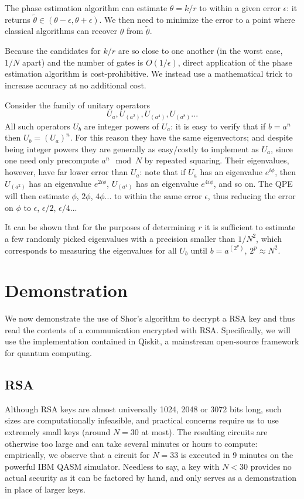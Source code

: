 \documentclass[conference]{IEEEtran}
\begin{document}
The phase estimation algorithm can estimate $\theta=k/r$ to within a given error $\epsilon$: it returns $\widetilde\theta \in (\theta-\epsilon, \theta+\epsilon)$. We then need to minimize the error to a point where classical algorithms can recover $\theta$ from $\widetilde\theta$.

Because the candidates for $k/r$ are so close to one another (in the worst case, $1/N$ apart) and the number of gates is $O(1/\epsilon)$, direct application of the phase estimation algorithm is cost-prohibitive. We instead use a mathematical trick to increase accuracy at no additional cost.

Consider the family of unitary operators
\begin{equation}
U_a, U_{(a^2)}, U_{(a^4)}, U_{(a^8)}...
\end{equation}
All such operators $U_b$ are integer powers of $U_a$: it is easy to verify that if $b = a^n$ then $U_b = (U_a)^n$. For this reason they have the same eigenvectors; and despite being integer powers they are generally as easy/costly to implement as $U_a$, since one need only precompute $a^n \mod N$ by repeated squaring. Their eigenvalues, however, have far lower error than $U_a$: note that if $U_a$ has an eigenvalue $e^{i\phi}$, then $U_{(a^2)}$ has an eigenvalue $e^{2i\phi}$, $U_{(a^4)}$ has an eigenvalue $e^{4i\phi}$, and so on. The QPE will then estimate $\phi$, $2\phi$, $4\phi$... to within the same error $\epsilon$, thus reducing the error on $\phi$ to $\epsilon$, $\epsilon/2$, $\epsilon/4$...

It can be shown that for the purposes of determining $r$ it is sufficient to estimate a few randomly picked eigenvalues with a precision smaller than $1/N^2$, which corresponds to measuring the eigenvalues for all $U_b$ until $b=a^{(2^p)}$, $2^p \approx N^2$.

\section{Demonstration}
We now demonstrate the use of Shor's algorithm to decrypt a RSA key and thus read the contents of a communication encrypted with RSA. Specifically, we will use the implementation contained in Qiskit, a mainstream open-source framework for quantum computing.

\subsection{RSA}
Although RSA keys are almost universally 1024, 2048 or 3072 bits long, such sizes are computationally infeasible, and practical concerns require us to use extremely small keys (around $N=30$ at most). The resulting circuits are otherwise too large and can take several minutes or hours to compute: empirically, we observe that a circuit for $N=33$ is executed in 9 minutes on the powerful IBM QASM simulator. Needless to say, a key with $N<30$ provides no actual security as it can be factored by hand, and only serves as a demonstration in place of larger keys.
\end{document}
